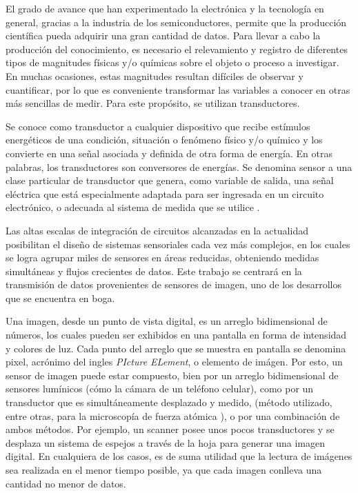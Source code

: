El grado de avance que han experimentado la electrónica y la tecnología en general, gracias a la industria de los semiconductores, permite que la producción científica pueda adquirir una gran cantidad de datos. Para llevar a cabo la producción del conocimiento, es necesario el relevamiento y registro de diferentes tipos de magnitudes físicas y/o químicas sobre el objeto o proceso a investigar. En muchas ocasiones, estas magnitudes resultan difíciles de observar y cuantificar, por lo que es conveniente transformar las variables a conocer en otras más sencillas de medir. Para este propósito, se utilizan transductores.%

Se conoce como transductor a cualquier dispositivo que recibe estímulos energéticos de una condición, situación o fenómeno físico y/o químico y los convierte en una señal asociada y definida de otra forma de energía\cite{Pallas-Areny2001,considine1971encyclopedia}. En otras palabras, los transductores son conversores de energías\cite{considine1971encyclopedia,Pallas-Areny2001,PerezGarcia2008}. Se denomina sensor a una clase particular de transductor que genera, como variable de salida, una señal eléctrica que está especialmente adaptada para ser ingresada en un circuito electrónico, o adecuada al sistema de medida que se utilice \cite{Fraden2010,Slawinski2011,Ogata2002}.%

Las altas escalas de integración de circuitos alcanzadas en la actualidad posibilitan el diseño de sistemas sensoriales cada vez más complejos, en los cuales se logra agrupar miles de sensores en áreas reducidas, obteniendo medidas simultáneas y flujos crecientes de datos. Este trabajo se centrará en la transmisión de datos provenientes de sensores de imagen, uno de los desarrollos que se encuentra en boga.%

Una imagen, desde un punto de vista digital, es un arreglo bidimensional de números, los cuales pueden ser exhibidos en una pantalla en forma de intensidad y colores de luz. Cada punto del arreglo que se muestra en pantalla se denomina pixel, acrónimo del ingles {\it PIcture ELement}, o elemento de imágen. Por esto, un sensor de imagen puede estar compuesto, bien por un arreglo bidimensional de sensores lumínicos (cómo la cámara de un teléfono celular), como por un transductor que es simultáneamente desplazado y medido, (método utilizado, entre otras, para la microscopía de fuerza atómica \cite{Binnig1983}), o por una combinación de ambos métodos. Por ejemplo, un scanner posee unos pocos transductores y se desplaza un sistema de espejos a través de la hoja para generar una imagen digital. En cualquiera de los casos, es de suma utilidad que la lectura de imágenes sea realizada en el menor tiempo posible, ya que cada imagen conlleva una cantidad no menor de datos.%

